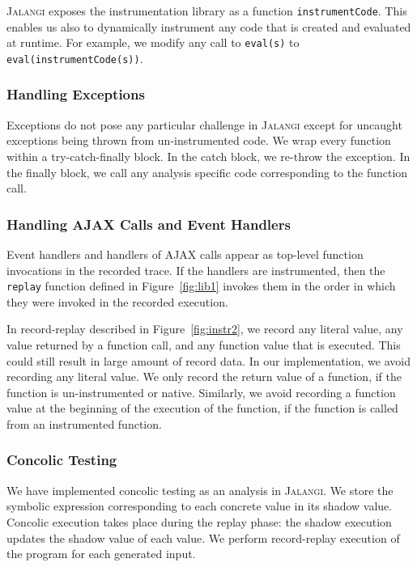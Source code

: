 \documentclass{sig-alternate}
\def\jalangi{\textsc{Jalangi}}
\begin{document}
\jalangi{} exposes the instrumentation
library as a function \texttt{instrumentCode}.  This enables us also
to dynamically instrument any code that is created and evaluated at
runtime.  For example, we modify any call to \texttt{eval(s)} to
\texttt{eval(instrumentCode(s))}.

\subsubsection*{Handling Exceptions}
\label{sec:handling-exceptions}

Exceptions do not pose any particular challenge in \jalangi{} except
for uncaught exceptions being thrown from un-instrumented code.  We
wrap every function within a try-catch-finally block.  In the catch
block, we re-throw the exception.  In the finally block, we call any
analysis specific code corresponding to the function call.

\subsubsection*{Handling AJAX Calls and Event Handlers}
\label{sec:handling-exceptions}

Event handlers and handlers of AJAX calls appear as top-level function
invocations in the recorded trace.  If the handlers are instrumented,
then the \texttt{replay} function defined in Figure~\ref{fig:lib1}
invokes them in the order in which they were invoked in the recorded
execution. 

In record-replay described in Figure~\ref{fig:instr2}, we record any
literal value, any value returned by a function call, and any function
value that is executed.  This could still result in large amount of
record data.  In our implementation, we avoid recording any literal
value.  We only record the return value of a function, if the function
is un-instrumented or native.  Similarly, we avoid recording a
function value at the beginning of the execution of the function, if
the function is called from an instrumented function.

\subsubsection*{Concolic Testing}
\label{sec:concolic-testing}

We have implemented concolic testing as an analysis in \jalangi{}.
We store the symbolic expression corresponding to each concrete value
in its shadow value.  Concolic execution takes place during the replay
phase: the shadow execution updates the shadow value of each
value.  We perform record-replay execution of the program for each
generated input.
\end{document}
